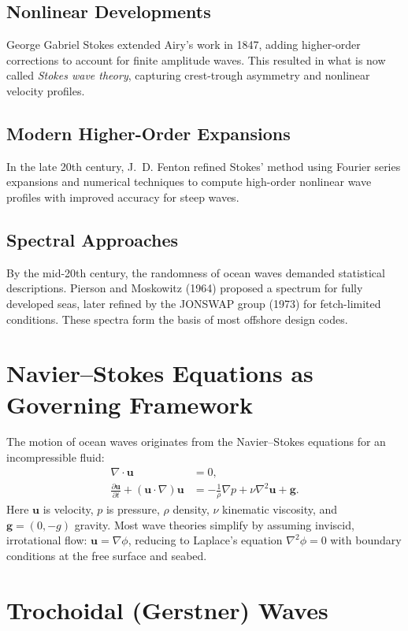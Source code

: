 \documentclass[11pt,a4paper]{article}
\begin{document}
\subsection{Nonlinear Developments}
George Gabriel Stokes extended Airy's work in 1847, adding higher-order corrections to account for finite amplitude waves. This resulted in what is now called \emph{Stokes wave theory}, capturing crest-trough asymmetry and nonlinear velocity profiles.

\subsection{Modern Higher-Order Expansions}
In the late 20th century, J.~D. Fenton refined Stokes’ method using Fourier series expansions and numerical techniques to compute high-order nonlinear wave profiles with improved accuracy for steep waves.

\subsection{Spectral Approaches}
By the mid-20th century, the randomness of ocean waves demanded statistical descriptions. Pierson and Moskowitz (1964) proposed a spectrum for fully developed seas, later refined by the JONSWAP group (1973) for fetch-limited conditions. These spectra form the basis of most offshore design codes.

\section{Navier–Stokes Equations as Governing Framework}
The motion of ocean waves originates from the Navier–Stokes equations for an incompressible fluid:
\begin{align}
\nabla \cdot \mathbf{u} &= 0, \\
\frac{\partial \mathbf{u}}{\partial t} + (\mathbf{u}\cdot\nabla)\mathbf{u} &= -\frac{1}{\rho}\nabla p + \nu \nabla^2 \mathbf{u} + \mathbf{g}.
\end{align}
Here $\mathbf{u}$ is velocity, $p$ is pressure, $\rho$ density, $\nu$ kinematic viscosity, and $\mathbf{g} = (0,-g)$ gravity.  
Most wave theories simplify by assuming inviscid, irrotational flow: $\mathbf{u} = \nabla \phi$, reducing to Laplace’s equation $\nabla^2 \phi = 0$ with boundary conditions at the free surface and seabed.

\section{Trochoidal (Gerstner) Waves}
\end{document}
